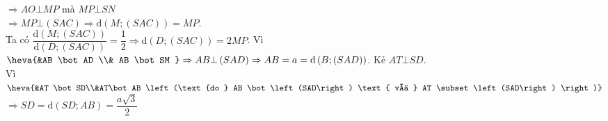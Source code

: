 \begin{ex}
{\begin{itemchoice}
			$\Rightarrow AO \bot MP$ mà $MP \bot SN$\\
			$\Rightarrow MP\bot \left(SAC\right) \Rightarrow \mathrm{d}\left(M;\left(SAC\right)\right) = MP$.\\
			Ta có $\dfrac{\mathrm{d}\left(M;\left(SAC\right)\right)}{\mathrm{d}\left(D;\left(SAC\right)\right)} = \dfrac{1}{2} \Rightarrow \mathrm{d}\left(D;\left(SAC\right)\right) = 2 MP$.
			\itemch Vì $\heva{&AB \bot AD \\& AB \bot SM } \Rightarrow AB \bot \left(SAD\right) \Rightarrow AB = a = \mathrm{d}\left(B;\left(SAD\right)\right)$.
			\itemch Kẻ $AT \bot SD$.\\
			Vì $\heva{&AT \bot SD\\&AT\bot AB \left(\text{do } AB \bot \left(SAD\right) \text{ và } AT \subset \left(SAD\right) \right)}$\\
			$\Rightarrow SD = \mathrm{d}\left(SD;AB\right)=\dfrac{a\sqrt{3}}{2}$
		\end{itemchoice}
	}
\end{ex}
